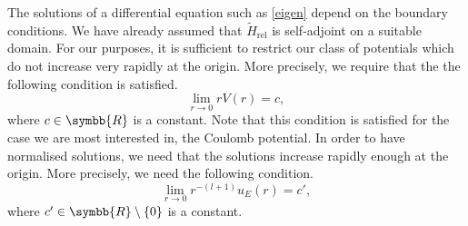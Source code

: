 \documentclass[12pt, a4 paper]{article}
\theoremstyle{definition}
\newcommand{\rr}{\symbb{R}}
\newcommand{\hrel}{\tilde{H}_\text{rel}}
\begin{document}
    The solutions of a differential equation such as \eqref{eigen} depend on the boundary conditions. We have already assumed that \(\hrel\) is self-adjoint on a suitable domain. For our purposes, it is sufficient to restrict our class of potentials which do not increase very rapidly at the origin. More precisely, we require that the the following condition is satisfied.
    \[
        \lim_{r \rightarrow 0} rV(r) = c,
    \]
    where \(c \in \rr\) is a constant. Note that this condition is satisfied for the case we are most interested in, the Coulomb potential. In order to have normalised solutions, we need that the solutions increase rapidly enough at the origin. More precisely, we need the following condition.
    \[
        \lim_{r \rightarrow 0} r^{-(l+1)} u_E(r) = c',
    \]
    where \(c' \in \rr\setminus\{0\}\) is a constant.

    \nocite{*}
    \printbibliography[heading=bibintoc]
    \printindex
\end{document}

